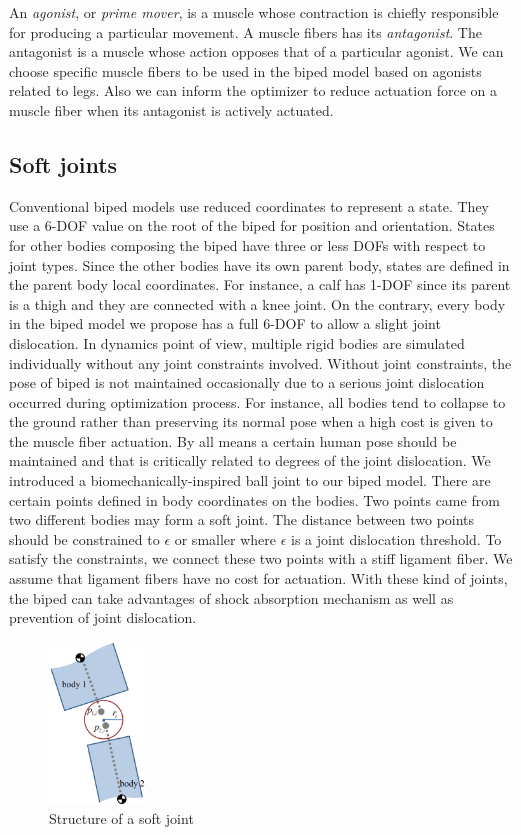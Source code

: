 \documentclass{acm_proc_article-sp}
\begin{document}
An \emph{agonist}, or \emph{prime mover}, is a muscle whose contraction is chiefly responsible for producing a particular movement.
A muscle fibers has its \emph{antagonist}. The antagonist is a muscle whose action opposes that of a particular agonist.
We can choose specific muscle fibers to be used in the biped model based on agonists related to legs.
Also we can inform the optimizer to reduce actuation force on a muscle fiber when its antagonist is actively actuated.

\subsection{Soft joints}

Conventional biped models use reduced coordinates to represent a state.
They use a 6-DOF value on the root of the biped for position and orientation.
States for other bodies composing the biped have three or less DOFs with respect to joint types.
Since the other bodies have its own parent body, states are defined in the parent body local coordinates.
For instance, a calf has 1-DOF since its parent is a thigh and they are connected with a knee joint.
On the contrary, every body in the biped model we propose has a full 6-DOF to allow a slight joint dislocation.
In dynamics point of view, multiple rigid bodies are simulated individually without any joint constraints involved.
Without joint constraints, the pose of biped is not maintained occasionally due to a serious joint dislocation occurred during optimization process.
For instance, all bodies tend to collapse to the ground rather than preserving its normal pose when a high cost is given to the muscle fiber actuation.
By all means a certain human pose should be maintained and that is critically related to degrees of the joint dislocation.
We introduced a biomechanically-inspired ball joint to our biped model.
There are certain points defined in body coordinates on the bodies.
Two points came from two different bodies may form a soft joint.
The distance between two points should be constrained to $\epsilon$ or smaller where $\epsilon$ is a joint dislocation threshold.
To satisfy the constraints, we connect these two points with a stiff ligament fiber.
We assume that ligament fibers have no cost for actuation.
With these kind of joints, the biped can take advantages of shock absorption mechanism as well as prevention of joint dislocation.

\begin{figure}[h!]
  \centering
  \includegraphics[width=1.0in]{softjoint}
  \caption{Structure of a soft joint}
\end{figure}
\end{document}
